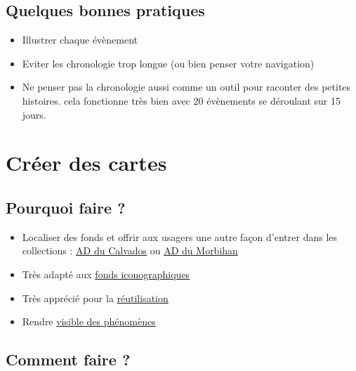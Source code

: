 \documentclass[
  letterpaper,
  DIV=11,
  numbers=noendperiod]{scrartcl}
\begin{document}
\subsection{Quelques bonnes pratiques}\label{quelques-bonnes-pratiques}

\begin{itemize}
\item
  Illustrer chaque évènement
\item
  Eviter les chronologie trop longue (ou bien penser votre navigation)
\item
  Ne penser pas la chronologie aussi comme un outil pour raconter des
  petites histoires. cela fonctionne très bien avec 20 évènements se
  déroulant sur 15 jours.
\end{itemize}

\section{Créer des cartes}\label{cruxe9er-des-cartes}

\subsection{Pourquoi faire ?}\label{pourquoi-faire-2}

\begin{itemize}
\item
  Localiser des fonds et offrir aux usagers une autre façon d'entrer
  dans les collections :
  \href{https://umap.openstreetmap.fr/fr/map/communes-du-calvados_1088012\#10/49.1220/-0.3543}{AD
  du Calvados} ou
  \href{https://patrimoines-archives.morbihan.fr/naviguer-par-carte}{AD
  du Morbihan}
\item
  Très adapté aux
  \href{https://umap.openstreetmap.fr/fr/map/carte-des-photos-en-open-data-des-am-de-marseille_628303\#12/43.3266/5.4252}{fonds
  iconographiques}
\item
  Très apprécié pour la
  \href{(https://umap.openstreetmap.fr/fr/map/documents-figures-des-archives-departementales-des_150869\#8/48.146/-1.950)}{réutilisation}
\item
  Rendre
  \href{https://archives.orleans-metropole.fr/sources-et-ressources-en-ligne/instruments-de-recherche/autorisations-durbanisme/visualisation-dynamique-des-permis-de-construire-de-1945-a-2007}{visible
  des phénomènes}
\end{itemize}

\subsection{Comment faire ?}\label{comment-faire-2}
\end{document}
